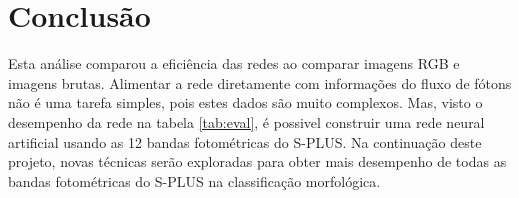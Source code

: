 \section{Conclusão}

Esta análise comparou a eficiência das redes ao comparar imagens RGB e imagens brutas. Alimentar a rede diretamente com informações do fluxo de fótons não é uma tarefa simples, pois estes dados são muito complexos. Mas, visto o desempenho da rede na tabela \ref{tab:eval}, é possivel construir uma rede neural artificial usando as 12 bandas fotométricas do S-PLUS. Na continuação deste projeto, novas técnicas serão exploradas para obter mais desempenho de todas as bandas fotométricas do S-PLUS na classificação morfológica.

